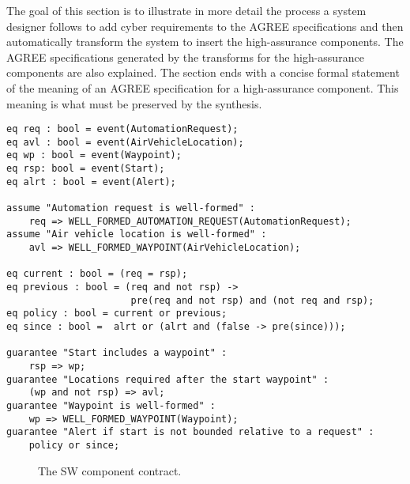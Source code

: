 The goal of this section is to illustrate in more detail the process a
system designer follows to add cyber requirements to the AGREE
specifications and then automatically transform the system to insert
the high-assurance components. The AGREE specifications generated by
the transforms for the high-assurance components are also
explained. The section ends with a concise formal statement of the
meaning of an AGREE specification for a high-assurance component. This
meaning is what must be preserved by the synthesis.

\newsavebox{\sw}
\begin{lrbox}{\sw}
\begin{lstlisting}[style=agree]
eq req : bool = event(AutomationRequest);
eq avl : bool = event(AirVehicleLocation);
eq wp : bool = event(Waypoint);
eq rsp: bool = event(Start);
eq alrt : bool = event(Alert);

assume "Automation request is well-formed" :
    req => WELL_FORMED_AUTOMATION_REQUEST(AutomationRequest);
assume "Air vehicle location is well-formed" :
    avl => WELL_FORMED_WAYPOINT(AirVehicleLocation);

eq current : bool = (req = rsp);
eq previous : bool = (req and not rsp) ->
                      pre(req and not rsp) and (not req and rsp);
eq policy : bool = current or previous;
eq since : bool =  alrt or (alrt and (false -> pre(since)));

guarantee "Start includes a waypoint" :
    rsp => wp;
guarantee "Locations required after the start waypoint" :
    (wp and not rsp) => avl;
guarantee "Waypoint is well-formed" :
    wp => WELL_FORMED_WAYPOINT(Waypoint);
guarantee "Alert if start is not bounded relative to a request" :
    policy or since;
\end{lstlisting}
\end{lrbox}

\begin{figure}
  \begin{center}
    \scalebox{0.60}{\usebox{\sw}}
  \end{center}
  \caption{The SW component contract.}
  \label{fig:sw}
\end{figure}

